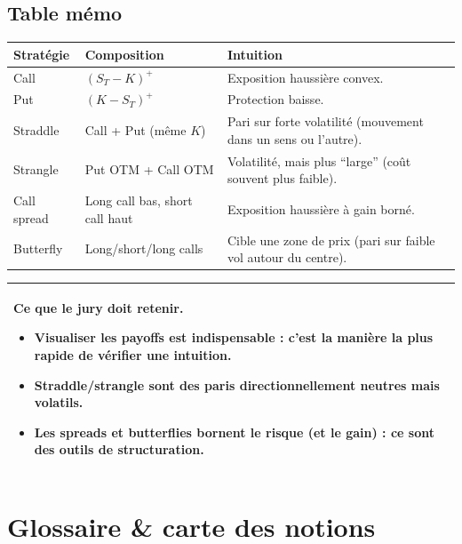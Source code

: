 \documentclass[11pt,a4paper]{report}
\newcommand{\1}{\mathbbm{1}}
\theoremstyle{definition}
\theoremstyle{plain}
\theoremstyle{remark}
\newenvironment{jurybox}{%
  \begin{center}
  \setlength{\tabcolsep}{6pt}%
  \renewcommand{\arraystretch}{1.1}%
  \begin{tabular}{|p{0.94\textwidth}|}
  \hline
  \small\textbf{Ce que le jury doit retenir.}\par\medskip
}{%
  \\ \hline
  \end{tabular}
  \end{center}
}
\begin{document}
\section{Table mémo}
\begin{longtable}{@{}p{3.4cm}p{4.2cm}p{6.8cm}@{}}
\toprule
Stratégie & Composition & Intuition \\
\midrule
Call & $(S_T-K)^+$ & Exposition haussière convex. \\
Put & $(K-S_T)^+$ & Protection baisse. \\
Straddle & Call + Put (même $K$) & Pari sur forte volatilité (mouvement dans un sens ou l'autre). \\
Strangle & Put OTM + Call OTM & Volatilité, mais plus ``large'' (coût souvent plus faible). \\
Call spread & Long call bas, short call haut & Exposition haussière à gain borné. \\
Butterfly & Long/short/long calls & Cible une zone de prix (pari sur faible vol autour du centre). \\
\bottomrule
\end{longtable}

\begin{jurybox}
\begin{itemize}
\item Visualiser les payoffs est indispensable : c'est la manière la plus rapide de vérifier une intuition.
\item Straddle/strangle sont des paris directionnellement neutres mais volatils.
\item Les spreads et butterflies bornent le risque (et le gain) : ce sont des outils de structuration.
\end{itemize}
\end{jurybox}

\chapter{Glossaire \& carte des notions}
\label{app:glossary}
\end{document}
